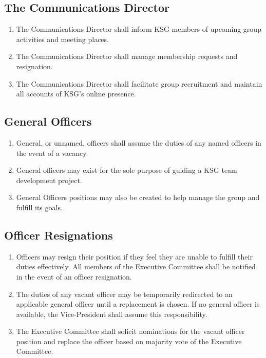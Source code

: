 \documentclass[12pt,executivepaper]{article}
\begin{document}
\subsection{The Communications Director}
\begin{enumerate}
    \item The Communications Director shall inform KSG members of upcoming group activities
          and meeting places.
    \item The Communications Director shall manage membership requests and resignation.
    \item The Communications Director shall facilitate group recruitment and maintain all
          accounts of KSG's online presence.
\end{enumerate}

\subsection{General Officers}
\begin{enumerate}
    \item General, or unnamed, officers shall assume the duties of any named
          officers in the event of a vacancy.
    \item General officers may exist for the sole purpose of guiding a KSG team
          development project.
    \item General Officers positions may also be created to help manage the
          group and fulfill its goals.
\end{enumerate}

\subsection{Officer Resignations}
\begin{enumerate}
    \item Officers may resign their position if they feel they are unable to
          fulfill their duties effectively. All members of the Executive
          Committee shall be notified in the event of an officer resignation.
    \item The duties of any vacant officer may be temporarily redirected to
          an applicable general officer until a replacement is chosen. If
          no general officer is available, the Vice-President shall
          assume this responsibility.
    \item The Executive Committee shall solicit nominations for the vacant
          officer position and replace the officer based on majority vote of
          the Executive Committee.
\end{enumerate}
\end{document}
